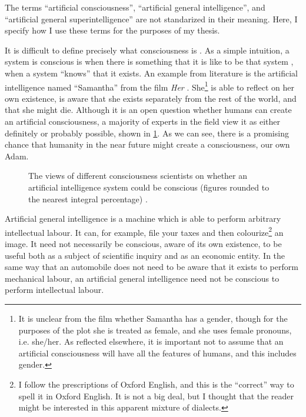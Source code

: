 \documentclass[12pt]{report}
\begin{document}
The terms \enquote{artificial consciousness}, \enquote{artificial general intelligence}, and \enquote{artificial general superintelligence} are not standarized in their meaning.
Here, I specify how I use these terms for the purposes of my thesis.

It is difficult to define precisely what consciousness is \cite{Butlin2023-jm}.
As a simple intuition, a system is conscious is when there is something that it is like to be that system \cite{Nagel1974-dv}, when a system \enquote{knows} that it exists.
An example from literature is the artificial intelligence named \enquote{Samantha} from the film \textit{Her} \cite{Jonze2013-pk}.
She\footnote{It is unclear from the film whether Samantha has a gender, though for the purposes of the plot she is treated as female, and she uses female pronouns, i.e. she/her. As reflected elsewhere, it is important not to assume that an artificial consciousness will have all the features of humans, and this includes gender.} is able to reflect on her own existence, is aware that she exists separately from the rest of the world, and that she might die.
Although it is an open question whether humans can create an artificial consciousness, a majority of experts in the field view it as either definitely or probably possible, shown in \cref{fig:whether-an-ai-can-be-conscious}.
As we can see, there is a promising chance that humanity in the near future might create a consciousness, our own Adam.

\begin{figure}
    \centering
    \caption{The views of different consciousness scientists on whether an artificial intelligence system could be conscious (figures rounded to the nearest integral percentage) \cite{Francken2022-uk}.}
    \label{fig:whether-an-ai-can-be-conscious}
\end{figure}

Artificial general intelligence is a machine which is able to perform arbitrary intellectual labour.
It can, for example, file your taxes and then colourize\footnote{I follow the prescriptions of Oxford English, and this is the \enquote{correct} way to spell it in Oxford English. It is not a big deal, but I thought that the reader might be interested in this apparent mixture of dialects.} an image.
It need not necessarily be conscious, aware of its own existence, to be useful both as a subject of scientific inquiry and as an economic entity.
In the same way that an automobile does not need to be aware that it exists to perform mechanical labour, an artificial general intelligence need not be conscious to perform intellectual labour.
\end{document}

